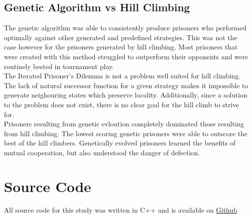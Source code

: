 \documentclass[12pt]{article}
\begin{document}
\subsection{Genetic Algorithm vs Hill Climbing}
The genetic algorithm was able to consistently produce prisoners who performed
optimally against other generated and predefined strategies. This was not the
case however for the prisoners generated by hill climbing. Most prisoners
that were created with this method struggled to outperform their opponents
and were routinely bested in tournament play. \\

The Iterated Prisoner's Dilemma is not a problem well suited for hill climbing.
The lack of natural successor function for a given strategy makes it impossible
to generate neighouring states which preserve locality.  Additionally, since
a solution to the problem does not exist, there is no clear goal for the hill climb
to strive for. \\


Prisoners resulting from genetic evloution completely dominated those resulting
from hill climbing.  The lowest scoring genetic prisoners were able to outscore
the best of the hill climbers.  Genetically evolved prisoners learned the benefits
of mutual cooperation, but also understood the danger of defection.

\pagebreak

\section{Source Code}
All source code for this study was written in C++ and is
available on
\href{https://github.com/Quinny/IteratedPrisoners}{Github}
\end{document}
